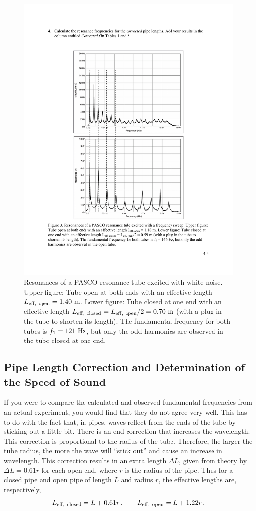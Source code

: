 \documentclass[11pt]{NSF}
\def\be{\begin{equation}}
\def\ee{\end{equation}}
\begin{document}
\begin{figure}[hbtp]
\begin{center}
\includegraphics[width=.7\textwidth]{fig4_3}
\caption{Resonances of a PASCO resonance tube excited with white noise.
Upper figure: Tube open at both ends with an effective length 
$L_{\rm eff,\ open} = 1.40~{\rm m}$.
Lower figure: Tube closed at one end with an effective length 
$L_{\rm eff,\ closed} = L_{\rm eff,\ open}/2 = 0.70~{\rm m}$ 
(with a plug in the tube to shorten its length). 
The fundamental frequency for both tubes is $f_1 = 121~{\rm Hz}$, 
but only the odd harmonics are observed in the tube closed at one end.}
\label{f:3} 
\end{center} 
\end{figure}
%

\subsection{Pipe Length Correction and Determination of the Speed of Sound}

If you were to compare the calculated and observed
fundamental frequencies from an actual experiment,
you would find that they do not agree very well.
This has to do with the fact that, in pipes, waves 
reflect from the ends of the tube by sticking out a little bit. 
There is an end correction that increases the wavelength. 
This correction is proportional to the radius of the tube. 
Therefore, the larger the tube radius, the more the wave 
will ``stick out” and cause an increase in wavelength. 
This correction results in an extra length $\Delta L$, 
given from theory by $\Delta L = 0.61 r$ for each open end, 
where $r$ is the radius of the pipe. 
Thus for a closed pipe and open pipe of length $L$ and 
radius $r$, the effective lengths are, respectively,
%
\be
L_{\rm eff,\ closed} = L + 0.61 r\,,
\qquad
L_{\rm eff,\ open} = L + 1.22 r\,.
\label{e:Leff}
\ee
\end{document}

